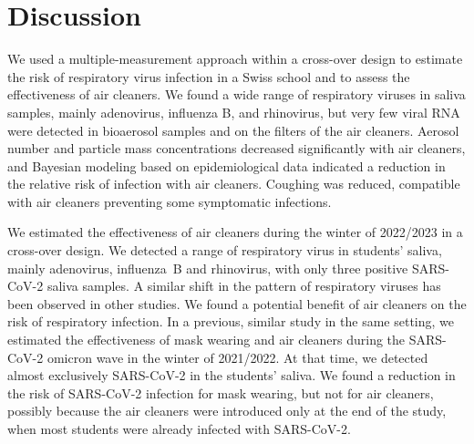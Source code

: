 \documentclass[fleqn,11pt]{wlscirep}
\begin{document}
\FloatBarrier

\newpage

\section*{Discussion}


We used a multiple-measurement approach within a cross-over design to estimate the risk of respiratory virus infection in a Swiss school and to assess the effectiveness of air cleaners. We found a wide range of respiratory viruses in saliva samples, mainly adenovirus, influenza B, and rhinovirus, but very few viral RNA were detected in bioaerosol samples and on the filters of the air cleaners. Aerosol number and particle mass concentrations decreased significantly with air cleaners, and Bayesian modeling based on epidemiological data indicated a reduction in the relative risk of infection with air cleaners. Coughing was reduced, compatible with air cleaners preventing some symptomatic infections.


We estimated the effectiveness of air cleaners during the winter of 2022/2023 in a cross-over design. We detected a range of respiratory virus in students' saliva, mainly adenovirus, influenza~B and rhinovirus, with only three positive SARS-CoV-2 saliva samples. A similar shift in the pattern of respiratory viruses has been observed in other studies\cite{Nygaard2023Lancet,Sauteur2022EuroSurv}. We found a potential benefit of air cleaners on the risk of respiratory infection. In a previous, similar study in the same setting\cite{Banholzer2023PLoSMed}, we estimated the effectiveness of mask wearing and air cleaners during the SARS-CoV-2 omicron wave in the winter of 2021/2022. At that time, we detected almost exclusively SARS-CoV-2 in the students' saliva. We found a reduction in the risk of SARS-CoV-2 infection for mask wearing, but not for air cleaners, possibly because the air cleaners were introduced only at the end of the study, when most students were already infected with SARS-CoV-2. 

\end{document}

